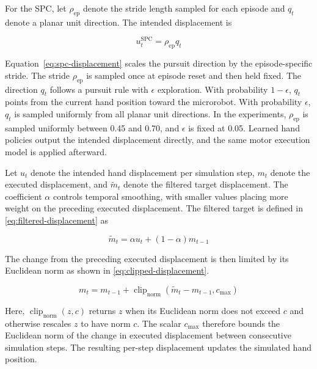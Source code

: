\documentclass[journal,twoside,web]{ieeecolor2}
\begin{document}
For the SPC, let $\rho_{\mathrm{ep}}$ denote the stride length sampled for each episode and $q_t$ denote a planar unit direction. The intended displacement is

\begin{equation}
u_t^{\mathrm{SPC}} = \rho_{\mathrm{ep}} q_t
\label{eq:spc-displacement}
\end{equation}

Equation~\eqref{eq:spc-displacement} scales the pursuit direction by the episode-specific stride. The stride $\rho_{\mathrm{ep}}$ is sampled once at episode reset and then held fixed. The direction $q_t$ follows a pursuit rule with $\epsilon$ exploration. With probability $1-\epsilon$, $q_t$ points from the current hand position toward the microrobot. With probability $\epsilon$, $q_t$ is sampled uniformly from all planar unit directions. In the experiments, $\rho_{\mathrm{ep}}$ is sampled uniformly between 0.45 and 0.70, and $\epsilon$ is fixed at 0.05. Learned hand policies output the intended displacement directly, and the same motor execution model is applied afterward.

Let $u_t$ denote the intended hand displacement per simulation step, $m_t$ denote the executed displacement, and $\widetilde{m}_t$ denote the filtered target displacement. The coefficient $\alpha$ controls temporal smoothing, with smaller values placing more weight on the preceding executed displacement. The filtered target is defined in \eqref{eq:filtered-displacement} as

\begin{equation}
\widetilde{m}_t = \alpha u_t + (1-\alpha)m_{t-1}
\label{eq:filtered-displacement}
\end{equation}

The change from the preceding executed displacement is then limited by its Euclidean norm as shown in \eqref{eq:clipped-displacement}.

\begin{equation}
m_t = m_{t-1}
+ \operatorname{clip}_{\mathrm{norm}}
  \!\left(\widetilde{m}_t-m_{t-1},c_{\max}\right)
\label{eq:clipped-displacement}
\end{equation}

Here, $\operatorname{clip}_{\mathrm{norm}}(z,c)$ returns $z$ when its Euclidean norm does not exceed $c$ and otherwise rescales $z$ to have norm $c$. The scalar $c_{\max}$ therefore bounds the Euclidean norm of the change in executed displacement between consecutive simulation steps. The resulting per-step displacement updates the simulated hand position.
\end{document}
